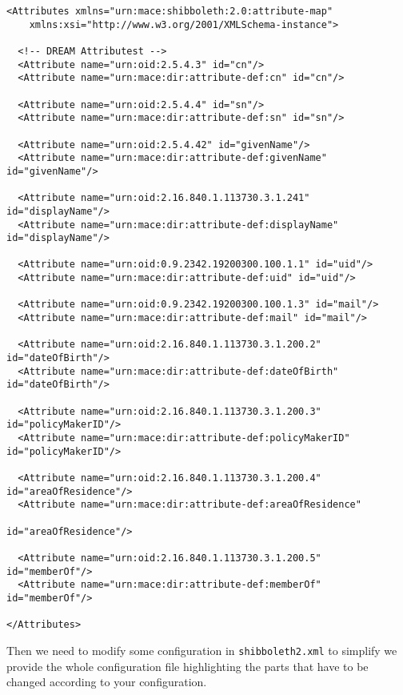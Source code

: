 \begin{verbatim}
<Attributes xmlns="urn:mace:shibboleth:2.0:attribute-map" 
    xmlns:xsi="http://www.w3.org/2001/XMLSchema-instance">

  <!-- DREAM Attributest -->
  <Attribute name="urn:oid:2.5.4.3" id="cn"/>
  <Attribute name="urn:mace:dir:attribute-def:cn" id="cn"/>

  <Attribute name="urn:oid:2.5.4.4" id="sn"/>
  <Attribute name="urn:mace:dir:attribute-def:sn" id="sn"/>

  <Attribute name="urn:oid:2.5.4.42" id="givenName"/>
  <Attribute name="urn:mace:dir:attribute-def:givenName" id="givenName"/>

  <Attribute name="urn:oid:2.16.840.1.113730.3.1.241" id="displayName"/>
  <Attribute name="urn:mace:dir:attribute-def:displayName" id="displayName"/>

  <Attribute name="urn:oid:0.9.2342.19200300.100.1.1" id="uid"/>
  <Attribute name="urn:mace:dir:attribute-def:uid" id="uid"/>

  <Attribute name="urn:oid:0.9.2342.19200300.100.1.3" id="mail"/>
  <Attribute name="urn:mace:dir:attribute-def:mail" id="mail"/>

  <Attribute name="urn:oid:2.16.840.1.113730.3.1.200.2" id="dateOfBirth"/>
  <Attribute name="urn:mace:dir:attribute-def:dateOfBirth" id="dateOfBirth"/>

  <Attribute name="urn:oid:2.16.840.1.113730.3.1.200.3" id="policyMakerID"/>
  <Attribute name="urn:mace:dir:attribute-def:policyMakerID" id="policyMakerID"/>

  <Attribute name="urn:oid:2.16.840.1.113730.3.1.200.4" id="areaOfResidence"/>
  <Attribute name="urn:mace:dir:attribute-def:areaOfResidence" 
                                                        id="areaOfResidence"/>

  <Attribute name="urn:oid:2.16.840.1.113730.3.1.200.5" id="memberOf"/>
  <Attribute name="urn:mace:dir:attribute-def:memberOf" id="memberOf"/>

</Attributes>

\end{verbatim}

Then we need to modify some configuration in \texttt{shibboleth2.xml} to simplify we provide the whole configuration file highlighting the parts that have to be changed according to your configuration. 

